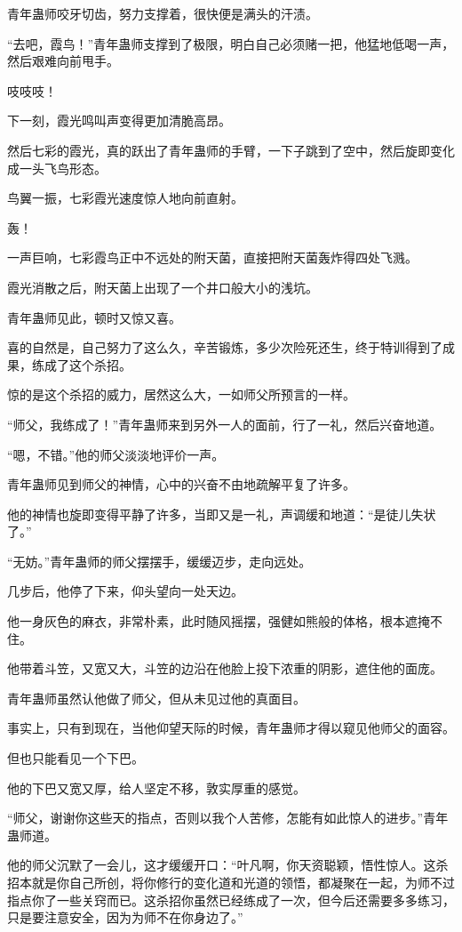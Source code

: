 \begin{this_body}
青年蛊师咬牙切齿，努力支撑着，很快便是满头的汗渍。

“去吧，霞鸟！”青年蛊师支撑到了极限，明白自己必须赌一把，他猛地低喝一声，然后艰难向前甩手。

吱吱吱！

下一刻，霞光鸣叫声变得更加清脆高昂。

然后七彩的霞光，真的跃出了青年蛊师的手臂，一下子跳到了空中，然后旋即变化成一头飞鸟形态。

鸟翼一振，七彩霞光速度惊人地向前直射。

轰！

一声巨响，七彩霞鸟正中不远处的附天菌，直接把附天菌轰炸得四处飞溅。

霞光消散之后，附天菌上出现了一个井口般大小的浅坑。

青年蛊师见此，顿时又惊又喜。

喜的自然是，自己努力了这么久，辛苦锻炼，多少次险死还生，终于特训得到了成果，练成了这个杀招。

惊的是这个杀招的威力，居然这么大，一如师父所预言的一样。

“师父，我练成了！”青年蛊师来到另外一人的面前，行了一礼，然后兴奋地道。

“嗯，不错。”他的师父淡淡地评价一声。

青年蛊师见到师父的神情，心中的兴奋不由地疏解平复了许多。

他的神情也旋即变得平静了许多，当即又是一礼，声调缓和地道：“是徒儿失状了。”

“无妨。”青年蛊师的师父摆摆手，缓缓迈步，走向远处。

几步后，他停了下来，仰头望向一处天边。

他一身灰色的麻衣，非常朴素，此时随风摇摆，强健如熊般的体格，根本遮掩不住。

他带着斗笠，又宽又大，斗笠的边沿在他脸上投下浓重的阴影，遮住他的面庞。

青年蛊师虽然认他做了师父，但从未见过他的真面目。

事实上，只有到现在，当他仰望天际的时候，青年蛊师才得以窥见他师父的面容。

但也只能看见一个下巴。

他的下巴又宽又厚，给人坚定不移，敦实厚重的感觉。

“师父，谢谢你这些天的指点，否则以我个人苦修，怎能有如此惊人的进步。”青年蛊师道。

他的师父沉默了一会儿，这才缓缓开口：“叶凡啊，你天资聪颖，悟性惊人。这杀招本就是你自己所创，将你修行的变化道和光道的领悟，都凝聚在一起，为师不过指点你了一些关窍而已。这杀招你虽然已经练成了一次，但今后还需要多多练习，只是要注意安全，因为为师不在你身边了。”


\end{this_body}
